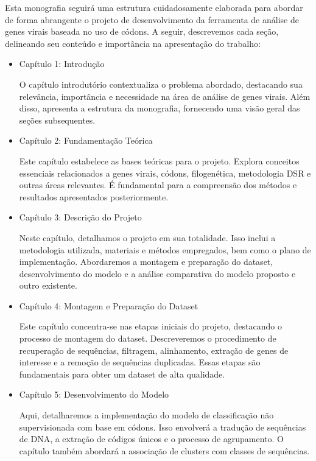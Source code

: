Esta monografia seguirá uma estrutura cuidadosamente elaborada para abordar de forma abrangente o projeto de desenvolvimento da ferramenta de análise de genes virais baseada no uso de códons. A seguir, descrevemos cada seção, delineando seu conteúdo e importância na apresentação do trabalho:

\begin{itemize}
  \item Capítulo 1: Introdução

        O capítulo introdutório contextualiza o problema abordado, destacando sua relevância, importância e necessidade na área de análise de genes virais. Além disso, apresenta a estrutura da monografia, fornecendo uma visão geral das seções subsequentes.

  \item Capítulo 2: Fundamentação Teórica

        Este capítulo estabelece as bases teóricas para o projeto. Explora conceitos essenciais relacionados a genes virais, códons, filogenética, metodologia DSR e outras áreas relevantes. É fundamental para a compreensão dos métodos e resultados apresentados posteriormente.

  \item Capítulo 3: Descrição do Projeto

        Neste capítulo, detalhamos o projeto em sua totalidade. Isso inclui a metodologia utilizada, materiais e métodos empregados, bem como o plano de implementação. Abordaremos a montagem e preparação do dataset, desenvolvimento do modelo e a análise comparativa do modelo proposto e outro existente.

  \item Capítulo 4: Montagem e Preparação do Dataset

        Este capítulo concentra-se nas etapas iniciais do projeto, destacando o processo de montagem do dataset. Descreveremos o procedimento de recuperação de sequências, filtragem, alinhamento, extração de genes de interesse e a remoção de sequências duplicadas. Essas etapas são fundamentais para obter um dataset de alta qualidade.

  \item Capítulo 5: Desenvolvimento do Modelo

        Aqui, detalharemos a implementação do modelo de classificação não supervisionada com base em códons. Isso envolverá a tradução de sequências de DNA, a extração de códigos únicos e o processo de agrupamento. O capítulo também abordará a associação de clusters com classes de sequências.


\end{itemize}
